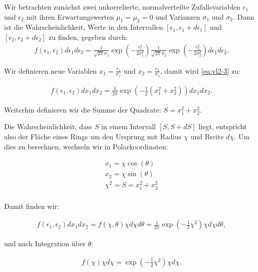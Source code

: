 Wir betrachten zunächst zwei unkorrelierte, normalverteilte Zufallsvariablen $\epsilon_1$ und $\epsilon_2$ mit ihren Erwartungswerten $\mu_1 = \mu_2 = 0$ und Varianzen $\sigma_1$ und $\sigma_2$.
Dann ist die Wahrscheinlichkeit, Werte in den Intervallen $\left[ \epsilon_1, \epsilon_1 + d\epsilon_1 \right]$ und $\left[ \epsilon_2, \epsilon_2 + d\epsilon_2 \right]$ zu finden, gegeben durch:
\begin{align}
f(\epsilon_1, \epsilon_2)d\epsilon_1 d\epsilon_2 = \frac{1}{\sqrt{2 \pi} \sigma_1} \exp{ \left( - \frac{ \epsilon_1^2}{2 \sigma_1^2} \right)} \frac{1}{\sqrt{2 \pi} \sigma_2} \exp{ \left( - \frac{ \epsilon_2^2}{2 \sigma_2^2} \right)}d\epsilon_1 d\epsilon_2.
\label{eq:vl2-3}
\end{align}

Wir definieren neue Variablen $x_1 = \frac{\epsilon_1}{\sigma_1}$ und $x_2 = \frac{\epsilon_2}{\sigma_2}$, damit wird \ref{eq:vl2-3} zu:

\begin{align}
f(\epsilon_1, \epsilon_2)dx_1 dx_2 = \frac{1}{2 \pi} \exp{ \left( - \frac{1}{2} \left( x_1^2 + x_2^2\right) \right)} dx_1 dx_2.
\end{align}

Weiterhin definieren wir die Summe der Quadrate: $S = x_1^2 + x_2^2$.

Die Wahrscheinlichkeit, dass $S$ in einem Intervall $\left[ S, S + dS \right]$ liegt, entspricht also der Fläche eines Rings um den Ursprung mit Radius $\chi$ und Breite $d\chi$. Um dies zu berechnen, wechseln wir in Polarkoordinaten:

\begin{align}
x_1 = \chi \cos{(\theta)}\\
x_2 = \chi \sin{(\theta)}\\
\chi^2 = S = x_1^2 + x_2^2\\
\end{align}

Damit finden wir:

\begin{align}
f(\epsilon_1, \epsilon_2)dx_1 dx_2 = f(\chi, \theta) \chi d\chi d\theta = \frac{1}{2 \pi} \exp{ \left( - \frac{1}{2} \chi^2 \right)} \chi d\chi d\theta,
\end{align}

und nach Integration über $\theta$:

\begin{align}
f(\chi) \chi d\chi = \exp{ \left( - \frac{1}{2} \chi^2 \right)} \chi d\chi.
\end{align}

